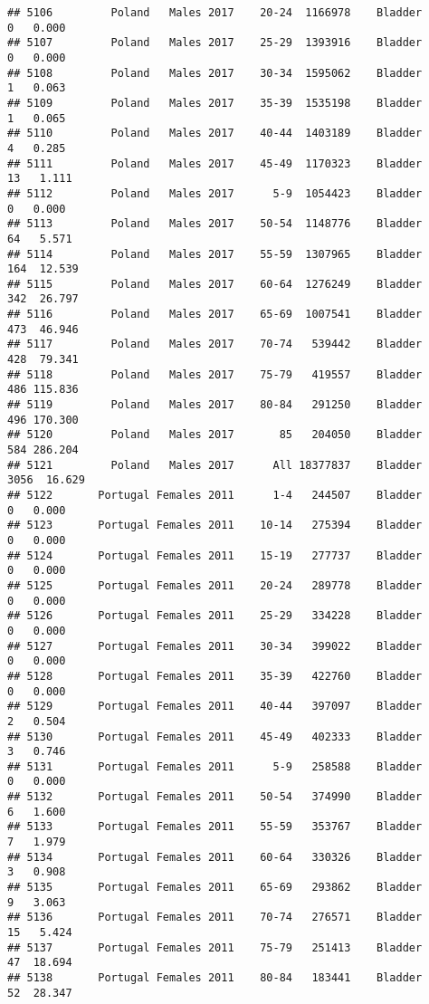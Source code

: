 \documentclass[
]{article}
\begin{document}
\begin{verbatim}
## 5106         Poland   Males 2017    20-24  1166978    Bladder      0   0.000
## 5107         Poland   Males 2017    25-29  1393916    Bladder      0   0.000
## 5108         Poland   Males 2017    30-34  1595062    Bladder      1   0.063
## 5109         Poland   Males 2017    35-39  1535198    Bladder      1   0.065
## 5110         Poland   Males 2017    40-44  1403189    Bladder      4   0.285
## 5111         Poland   Males 2017    45-49  1170323    Bladder     13   1.111
## 5112         Poland   Males 2017      5-9  1054423    Bladder      0   0.000
## 5113         Poland   Males 2017    50-54  1148776    Bladder     64   5.571
## 5114         Poland   Males 2017    55-59  1307965    Bladder    164  12.539
## 5115         Poland   Males 2017    60-64  1276249    Bladder    342  26.797
## 5116         Poland   Males 2017    65-69  1007541    Bladder    473  46.946
## 5117         Poland   Males 2017    70-74   539442    Bladder    428  79.341
## 5118         Poland   Males 2017    75-79   419557    Bladder    486 115.836
## 5119         Poland   Males 2017    80-84   291250    Bladder    496 170.300
## 5120         Poland   Males 2017       85   204050    Bladder    584 286.204
## 5121         Poland   Males 2017      All 18377837    Bladder   3056  16.629
## 5122       Portugal Females 2011      1-4   244507    Bladder      0   0.000
## 5123       Portugal Females 2011    10-14   275394    Bladder      0   0.000
## 5124       Portugal Females 2011    15-19   277737    Bladder      0   0.000
## 5125       Portugal Females 2011    20-24   289778    Bladder      0   0.000
## 5126       Portugal Females 2011    25-29   334228    Bladder      0   0.000
## 5127       Portugal Females 2011    30-34   399022    Bladder      0   0.000
## 5128       Portugal Females 2011    35-39   422760    Bladder      0   0.000
## 5129       Portugal Females 2011    40-44   397097    Bladder      2   0.504
## 5130       Portugal Females 2011    45-49   402333    Bladder      3   0.746
## 5131       Portugal Females 2011      5-9   258588    Bladder      0   0.000
## 5132       Portugal Females 2011    50-54   374990    Bladder      6   1.600
## 5133       Portugal Females 2011    55-59   353767    Bladder      7   1.979
## 5134       Portugal Females 2011    60-64   330326    Bladder      3   0.908
## 5135       Portugal Females 2011    65-69   293862    Bladder      9   3.063
## 5136       Portugal Females 2011    70-74   276571    Bladder     15   5.424
## 5137       Portugal Females 2011    75-79   251413    Bladder     47  18.694
## 5138       Portugal Females 2011    80-84   183441    Bladder     52  28.347

\end{verbatim}
\end{document}
